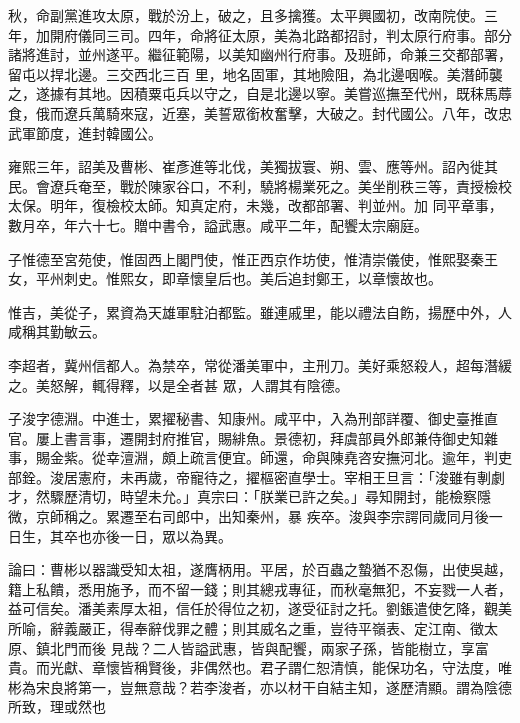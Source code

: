 \begin{pinyinscope}
 秋，命副黨進攻太原，戰於汾上，破之，且多擒獲。太平興國初，改南院使。三年，加開府儀同三司。四年，命將征太原，美為北路都招討，判太原行府事。部分諸將進討，並州遂平。繼征範陽，以美知幽州行府事。及班師，命兼三交都部署，留屯以捍北邊。三交西北三百
 里，地名固軍，其地險阻，為北邊咽喉。美潛師襲之，遂據有其地。因積粟屯兵以守之，自是北邊以寧。美嘗巡撫至代州，既秣馬蓐食，俄而遼兵萬騎來寇，近塞，美誓眾銜枚奮擊，大破之。封代國公。八年，改忠武軍節度，進封韓國公。



 雍熙三年，詔美及曹彬、崔彥進等北伐，美獨拔寰、朔、雲、應等州。詔內徙其民。會遼兵奄至，戰於陳家谷口，不利，驍將楊業死之。美坐削秩三等，責授檢校太保。明年，復檢校太師。知真定府，未幾，改都部署、判並州。加
 同平章事，數月卒，年六十七。贈中書令，謚武惠。咸平二年，配饗太宗廟庭。



 子惟德至宮苑使，惟固西上閣門使，惟正西京作坊使，惟清崇儀使，惟熙娶秦王女，平州刺史。惟熙女，即章懷皇后也。美后追封鄭王，以章懷故也。



 惟吉，美從子，累資為天雄軍駐泊都監。雖連戚里，能以禮法自飭，揚歷中外，人咸稱其勤敏云。



 李超者，冀州信都人。為禁卒，常從潘美軍中，主刑刀。美好乘怒殺人，超每潛緩之。美怒解，輒得釋，以是全者甚
 眾，人謂其有陰德。



 子浚字德淵。中進士，累擢秘書、知康州。咸平中，入為刑部詳覆、御史臺推直官。屢上書言事，遷開封府推官，賜緋魚。景德初，拜虞部員外郎兼侍御史知雜事，賜金紫。從幸澶淵，頗上疏言便宜。師還，命與陳堯咨安撫河北。逾年，判吏部銓。浚居憲府，未再歲，帝寵待之，擢樞密直學士。宰相王旦言：「浚雖有剸劇才，然驟歷清切，時望未允。」真宗曰：「朕業已許之矣。」尋知開封，能檢察隱微，京師稱之。累遷至右司郎中，出知秦州，暴
 疾卒。浚與李宗諤同歲同月後一日生，其卒也亦後一日，眾以為異。



 論曰：曹彬以器識受知太祖，遂膺柄用。平居，於百蟲之蟄猶不忍傷，出使吳越，籍上私饋，悉用施予，而不留一錢；則其總戎專征，而秋毫無犯，不妄戮一人者，益可信矣。潘美素厚太祖，信任於得位之初，遂受征討之托。劉鋹遣使乞降，觀美所喻，辭義嚴正，得奉辭伐罪之體；則其威名之重，豈待平嶺表、定江南、徵太原、鎮北門而後
 見哉？二人皆謚武惠，皆與配饗，兩家子孫，皆能樹立，享富貴。而光獻、章懷皆稱賢後，非偶然也。君子謂仁恕清慎，能保功名，守法度，唯彬為宋良將第一，豈無意哉？若李浚者，亦以材干自結主知，遂歷清顯。謂為陰德所致，理或然也



\end{pinyinscope}